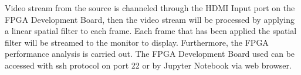 
Video stream from the source is channeled through the HDMI Input port on the FPGA Development Board, then the video stream will be processed by applying a linear spatial filter to each frame. Each frame that has been applied the spatial filter will be streamed to the monitor to display. Furthermore, the FPGA performance analysis is carried out. The FPGA Development Board used can be accessed with ssh protocol on port 22 or by Jupyter Notebook via web browser.

